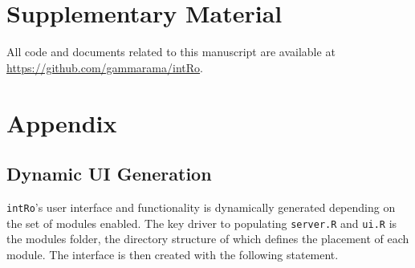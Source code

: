 \documentclass[12pt,]{article}
\begin{document}
\section{Supplementary Material}\label{supplementary-material}

All code and documents related to this manuscript are available at
\url{https://github.com/gammarama/intRo}.

\section{Appendix}\label{appendix}

\subsection{Dynamic UI Generation}\label{dynamic-ui-generation}

\texttt{intRo}'s user interface and functionality is dynamically
generated depending on the set of modules enabled. The key driver to
populating \texttt{server.R} and \texttt{ui.R} is the modules folder,
the directory structure of which defines the placement of each module.
The interface is then created with the following statement.

\footnotesize
\end{document}
